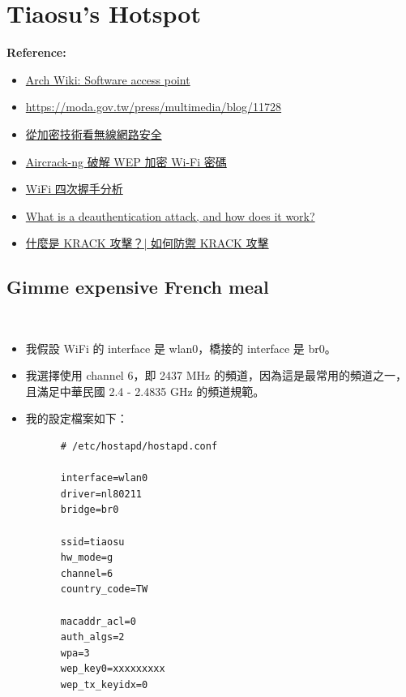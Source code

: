 \documentclass[12pt]{article}
\newenvironment{problem}[2][Problem]{\begin{trivlist}
\item[\hskip \labelsep {\bfseries #1}\hskip \labelsep {\bfseries #2}]}{\end{trivlist}}
\newenvironment{mycolorbox}[1][gray]{
  \renewmdenv[
    linewidth=2pt, linecolor=#1, backgroundcolor=#1!10,
    topline=false, bottomline=false, rightline=false,
    skipabove=10pt, skipbelow=10pt, innerleftmargin=10pt,
    innerrightmargin=0pt, innertopmargin=5pt, innerbottommargin=5pt
  ]{myquote}
  \begin{myquote}
}{\end{myquote}}
\begin{document}
\section{Tiaosu’s Hotspot}
\begin{mycolorbox}[teal]
  \textbf{Reference:}
  \footnotesize
  \begin{itemize}
    \item \href{https://wiki.archlinux.org/title/Software_access_point#Wi-Fi_link_layer}{Arch Wiki: Software access point}
    \item \url{https://moda.gov.tw/press/multimedia/blog/11728}
    \item \href{https://www.cisco.com/c/dam/global/zh_tw/assets/docs/news2_1.pdf}{從加密技術看無線網路安全}
    \item \href{https://then.tw/aircrack-ng-wep/}{Aircrack-ng 破解 WEP 加密 Wi-Fi 密碼}
    \item \href{https://kysonlok.gitbook.io/blog/wireless/4_way_handshake}{WiFi 四次握手分析}
    \item \href{https://nordvpn.com/zh-tw/blog/deauthentication-attack/}{What is a deauthentication attack, and how does it work?}
    \item \href{https://www.cloudflare.com/zh-tw/learning/security/what-is-a-krack-attack/}{什麼是 KRACK 攻擊？| 如何防禦 KRACK 攻擊}
  \end{itemize}
\end{mycolorbox}

\subsection{Gimme expensive French meal}
\begin{problem}{1. }　
  \begin{itemize}
    \item 我假設 WiFi 的 interface 是 wlan0，橋接的 interface 是 br0。
    \item 我選擇使用 channel 6，即 2437 MHz 的頻道，因為這是最常用的頻道之一，且滿足中華民國 2.4 - 2.4835 GHz 的頻道規範。
    \item 我的設定檔案如下：
    \begin{verbatim}
      # /etc/hostapd/hostapd.conf

      interface=wlan0
      driver=nl80211
      bridge=br0

      ssid=tiaosu
      hw_mode=g
      channel=6
      country_code=TW

      macaddr_acl=0
      auth_algs=2
      wpa=3
      wep_key0=xxxxxxxxx
      wep_tx_keyidx=0
    \end{verbatim}
  \end{itemize}
\end{problem}
\end{document}
